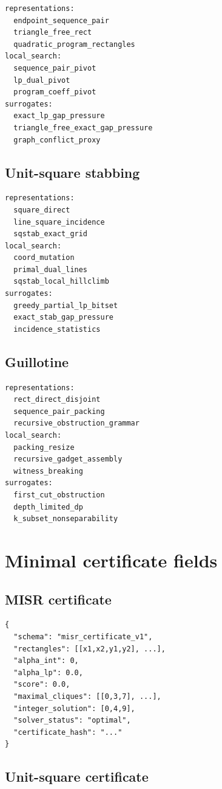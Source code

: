 \documentclass[11pt]{article}
\begin{document}
\begin{verbatim}
representations:
  endpoint_sequence_pair
  triangle_free_rect
  quadratic_program_rectangles
local_search:
  sequence_pair_pivot
  lp_dual_pivot
  program_coeff_pivot
surrogates:
  exact_lp_gap_pressure
  triangle_free_exact_gap_pressure
  graph_conflict_proxy
\end{verbatim}

\subsection{Unit-square stabbing}

\begin{verbatim}
representations:
  square_direct
  line_square_incidence
  sqstab_exact_grid
local_search:
  coord_mutation
  primal_dual_lines
  sqstab_local_hillclimb
surrogates:
  greedy_partial_lp_bitset
  exact_stab_gap_pressure
  incidence_statistics
\end{verbatim}

\subsection{Guillotine}

\begin{verbatim}
representations:
  rect_direct_disjoint
  sequence_pair_packing
  recursive_obstruction_grammar
local_search:
  packing_resize
  recursive_gadget_assembly
  witness_breaking
surrogates:
  first_cut_obstruction
  depth_limited_dp
  k_subset_nonseparability
\end{verbatim}

\section{Minimal certificate fields}

\subsection{MISR certificate}

\begin{verbatim}
{
  "schema": "misr_certificate_v1",
  "rectangles": [[x1,x2,y1,y2], ...],
  "alpha_int": 0,
  "alpha_lp": 0.0,
  "score": 0.0,
  "maximal_cliques": [[0,3,7], ...],
  "integer_solution": [0,4,9],
  "solver_status": "optimal",
  "certificate_hash": "..."
}
\end{verbatim}

\subsection{Unit-square certificate}
\end{document}
